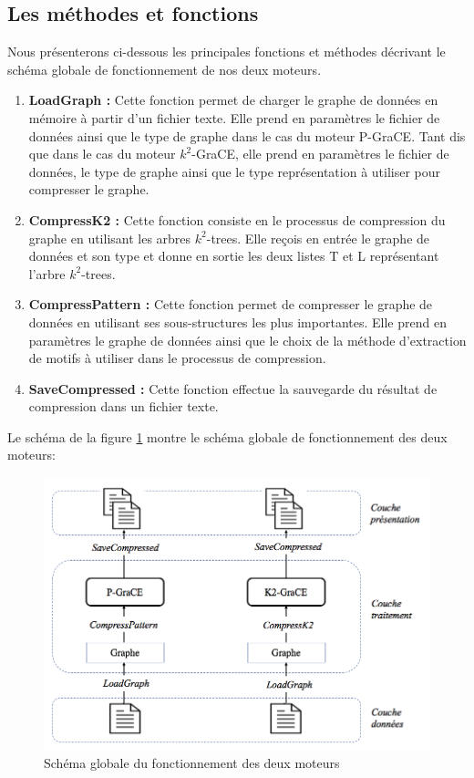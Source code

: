 \subsection{Les méthodes et fonctions }
	Nous présenterons ci-dessous les principales fonctions et méthodes décrivant le schéma globale de fonctionnement de nos deux moteurs.
	
	\begin{enumerate}[label=(\alph*)]
		\item \textbf{LoadGraph :} Cette fonction permet de charger le graphe de données en mémoire à partir d'un fichier texte. Elle prend en paramètres le fichier de données ainsi que le type de graphe dans le cas du moteur P-GraCE. Tant dis que dans le cas du moteur $k^2$-GraCE, elle prend en paramètres le fichier de données, le type de graphe ainsi que le type représentation à utiliser pour compresser le graphe.
		\item \textbf{CompressK2 :} Cette fonction consiste en le processus de compression du graphe en utilisant les arbres $k^2$-trees. Elle reçois en entrée le graphe de données et son type et donne en sortie les deux listes T et L représentant l'arbre $k^2$-trees.
		
		\item \textbf{CompressPattern :} Cette fonction permet de compresser le graphe de données en utilisant ses sous-structures les plus importantes. Elle prend en paramètres le graphe de données ainsi que le choix de la méthode d'extraction de motifs à utiliser dans le processus de compression.
		
		\item \textbf{SaveCompressed :}  Cette fonction effectue la sauvegarde du résultat de compression dans un fichier texte.
		
	\end{enumerate}	
	
	Le schéma de la figure \ref{Img:functMethod} montre le schéma globale de fonctionnement des deux moteurs:  
	
	\begin{figure}[H]
	
	\label{Img:functMethod}
	\includegraphics[scale=0.5]{ressources/image/funct.png}
	\centering
	\caption{Schéma globale du fonctionnement des deux moteurs}
 \end{figure}
	
